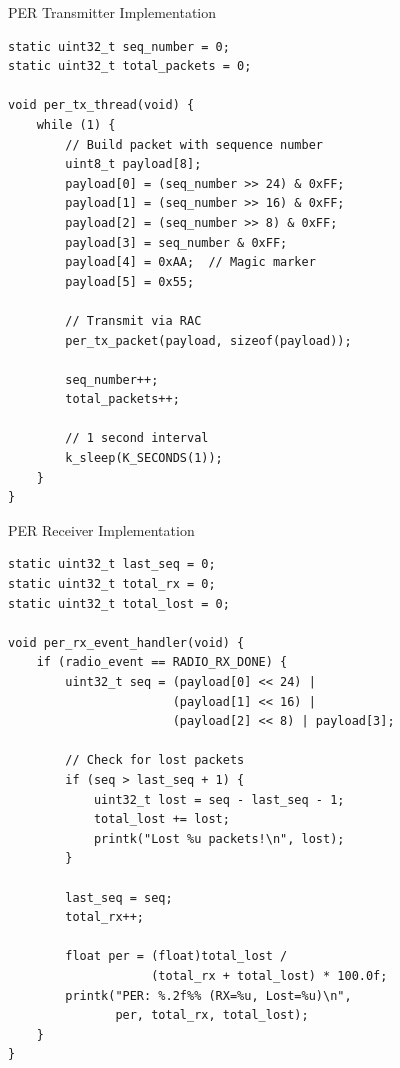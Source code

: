 \documentclass{beamer}
\begin{document}
\begin{frame}[fragile]{PER Transmitter Implementation}
\begin{lstlisting}[caption={PER TX - Continuous Transmission}]
static uint32_t seq_number = 0;
static uint32_t total_packets = 0;

void per_tx_thread(void) {
    while (1) {
        // Build packet with sequence number
        uint8_t payload[8];
        payload[0] = (seq_number >> 24) & 0xFF;
        payload[1] = (seq_number >> 16) & 0xFF;
        payload[2] = (seq_number >> 8) & 0xFF;
        payload[3] = seq_number & 0xFF;
        payload[4] = 0xAA;  // Magic marker
        payload[5] = 0x55;

        // Transmit via RAC
        per_tx_packet(payload, sizeof(payload));

        seq_number++;
        total_packets++;

        // 1 second interval
        k_sleep(K_SECONDS(1));
    }
}
\end{lstlisting}
\end{frame}

\begin{frame}[fragile]{PER Receiver Implementation}
\begin{lstlisting}[caption={PER RX - Detect Lost Packets}]
static uint32_t last_seq = 0;
static uint32_t total_rx = 0;
static uint32_t total_lost = 0;

void per_rx_event_handler(void) {
    if (radio_event == RADIO_RX_DONE) {
        uint32_t seq = (payload[0] << 24) |
                       (payload[1] << 16) |
                       (payload[2] << 8) | payload[3];

        // Check for lost packets
        if (seq > last_seq + 1) {
            uint32_t lost = seq - last_seq - 1;
            total_lost += lost;
            printk("Lost %u packets!\n", lost);
        }

        last_seq = seq;
        total_rx++;

        float per = (float)total_lost /
                    (total_rx + total_lost) * 100.0f;
        printk("PER: %.2f%% (RX=%u, Lost=%u)\n",
               per, total_rx, total_lost);
    }
}
\end{lstlisting}
\end{frame}
\end{document}
